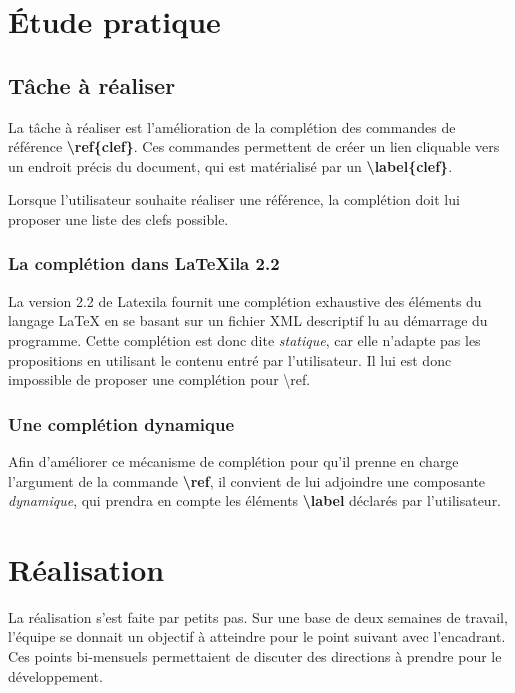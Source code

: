 \documentclass[a4paper,11pt]{report}
\begin{document}
\chapter{Étude pratique} %
\label{cha:etude_pratique}

\section{Tâche à réaliser} %
\label{sec:tache_a_realiser}

La tâche à réaliser est l'amélioration de la complétion des commandes de référence \textbf{\textbackslash{}ref\{clef\}}. Ces commandes permettent de créer un lien cliquable vers un endroit précis du document, qui est matérialisé par un \textbf{\textbackslash{}label\{clef\}}.

Lorsque l'utilisateur souhaite réaliser une référence, la complétion doit lui proposer une liste des clefs possible.

\subsection{La complétion dans LaTeXila 2.2}
\label{sub:completion}
La version 2.2 de Latexila fournit une complétion exhaustive des éléments du langage \LaTeX{} en se basant sur un fichier XML descriptif lu au démarrage du programme.
Cette complétion est donc dite \textit{statique}, car elle n'adapte pas les propositions en utilisant le contenu entré par l'utilisateur.
Il lui est donc impossible de proposer une complétion pour \textbackslash{}ref.

\subsection{Une complétion dynamique}
\label{sub:completion_dyn}
Afin d'améliorer ce mécanisme de complétion pour qu'il prenne en charge l'argument de la commande \textbf{\textbackslash{}ref}, il convient de lui adjoindre une composante \textit{dynamique}, qui prendra en compte les éléments \textbf{\textbackslash{}label} déclarés par l'utilisateur.

\chapter{Réalisation}
La réalisation s'est faite par petits pas. Sur une base de deux semaines de travail, l'équipe se donnait un objectif à atteindre pour le point suivant avec l'encadrant.
Ces points bi-mensuels permettaient de discuter des directions à prendre pour le développement.
\end{document}
